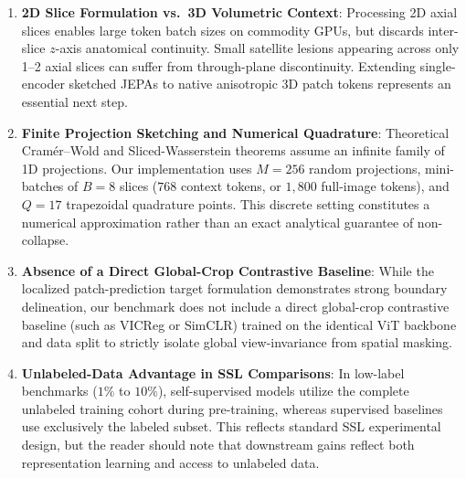 \documentclass{article}
\begin{document}
\begin{enumerate}
    \item \textbf{2D Slice Formulation vs.\ 3D Volumetric Context}: Processing 2D axial slices enables large token batch sizes on commodity GPUs, but discards inter-slice $z$-axis anatomical continuity. Small satellite lesions appearing across only 1--2 axial slices can suffer from through-plane discontinuity. Extending single-encoder sketched JEPAs to native anisotropic 3D patch tokens represents an essential next step.
    \item \textbf{Finite Projection Sketching and Numerical Quadrature}: Theoretical Cram\'er--Wold and Sliced-Wasserstein theorems assume an infinite family of 1D projections. Our implementation uses $M=256$ random projections, mini-batches of $B=8$ slices ($768$ context tokens, or $1,800$ full-image tokens), and $Q=17$ trapezoidal quadrature points. This discrete setting constitutes a numerical approximation rather than an exact analytical guarantee of non-collapse.
    \item \textbf{Absence of a Direct Global-Crop Contrastive Baseline}: While the localized patch-prediction target formulation demonstrates strong boundary delineation, our benchmark does not include a direct global-crop contrastive baseline (such as VICReg or SimCLR) trained on the identical ViT backbone and data split to strictly isolate global view-invariance from spatial masking.
    \item \textbf{Unlabeled-Data Advantage in SSL Comparisons}: In low-label benchmarks ($1\%$ to $10\%$), self-supervised models utilize the complete unlabeled training cohort during pre-training, whereas supervised baselines use exclusively the labeled subset. This reflects standard SSL experimental design, but the reader should note that downstream gains reflect both representation learning and access to unlabeled data.
\end{enumerate}
\end{document}
